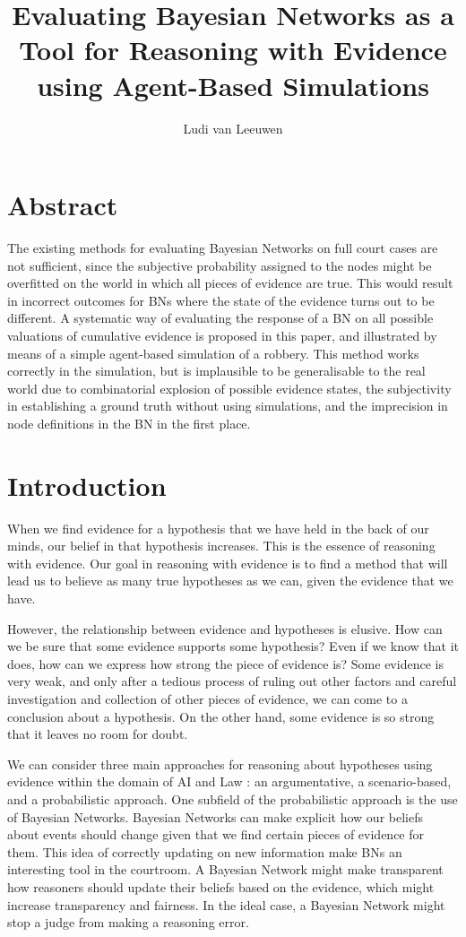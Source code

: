 \documentclass[12pt]{article}
\title{Evaluating Bayesian Networks as a Tool for Reasoning with Evidence using Agent-Based Simulations}
\author{Ludi van Leeuwen}
\date{}                                           %
\begin{document}
\maketitle
\newpage

\section*{Abstract}
The existing methods for evaluating Bayesian Networks on full court cases are not sufficient, since the subjective probability assigned to the nodes might be overfitted on the world in which all pieces of evidence are true. This would result in incorrect outcomes for BNs where the state of the evidence turns out to be different. A systematic way of evaluating the response of a BN on all possible valuations of cumulative evidence is proposed in this paper, and illustrated by means of a simple agent-based simulation of a robbery.  This method works correctly in the simulation, but is implausible to be generalisable to the real world due to combinatorial explosion of possible evidence states, the subjectivity in establishing a ground truth without using simulations, and the imprecision in node definitions in the BN in the first place.

\newpage

\tableofcontents
\newpage

\section{Introduction}
When we find evidence for a hypothesis that we have held in the back of our minds, our belief in that hypothesis increases. This is the essence of reasoning with evidence. Our goal in reasoning with evidence is to find a method that will lead us to believe as many true hypotheses as we can, given the evidence that we have.

However, the relationship between evidence and hypotheses is elusive. How can we be sure that some evidence supports some hypothesis? Even if we know that it does, how can we express how strong the piece of evidence is? Some evidence is very weak, and only after a tedious process of ruling out other factors and careful investigation and collection of other pieces of evidence, we can come to a conclusion about a hypothesis. On the other hand, some evidence is so strong that it leaves no room for doubt.

We can consider three main approaches for reasoning about hypotheses using evidence within the domain of AI and Law \citep{diBelloVerheij2018}: an argumentative, a scenario-based, and a probabilistic approach. One subfield of the probabilistic approach is the use of Bayesian Networks. Bayesian Networks can make explicit how our beliefs about events should change given that we find certain pieces of evidence for them. This idea of correctly updating on new information make BNs an interesting tool in the courtroom. A Bayesian Network might make transparent how reasoners should update their beliefs based on the evidence, which might increase transparency and fairness. In the ideal case, a Bayesian Network might stop a judge from making a reasoning error.
\end{document}
